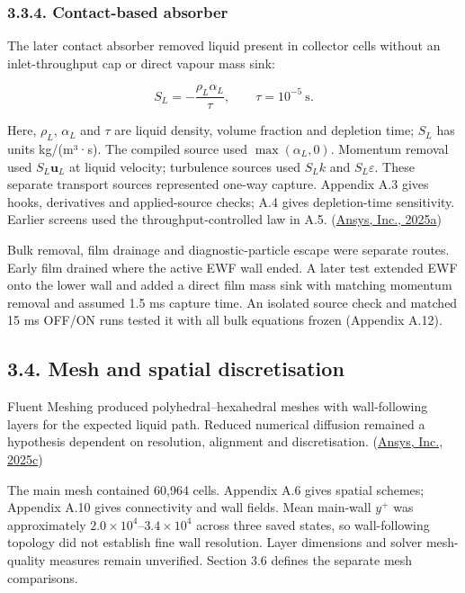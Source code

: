 \documentclass[
  12pt,
  a4paper,
]{article}
\begin{document}
\subsubsection{3.3.4. Contact-based
absorber}\label{contact-based-absorber}

The later contact absorber removed liquid present in collector cells
without an inlet-throughput cap or direct vapour mass sink:

\[
S_L=-\frac{\rho_L\alpha_L}{\tau},\qquad \tau=10^{-5}\ \mathrm{s}.
\]

Here, \(\rho_L\), \(\alpha_L\) and \(\tau\) are liquid density, volume
fraction and depletion time; \(S_L\) has units kg/(m³·s). The compiled
source used \(\max(\alpha_L,0)\). Momentum removal used
\(S_L\boldsymbol u_L\) at liquid velocity; turbulence sources used
\(S_Lk\) and \(S_L\varepsilon\). These separate transport sources
represented one-way capture. Appendix A.3 gives hooks, derivatives and
applied-source checks; A.4 gives depletion-time sensitivity. Earlier
screens used the throughput-controlled law in A.5.
(\href{https://ansyshelp.ansys.com/public/Views/Secured/corp/v252/en/flu_ug/flu_ug_bcs_sec_cell_zones.html}{Ansys,
Inc., 2025a})

Bulk removal, film drainage and diagnostic-particle escape were separate
routes. Early film drained where the active EWF wall ended. A later test
extended EWF onto the lower wall and added a direct film mass sink with
matching momentum removal and assumed 1.5 ms capture time. An isolated
source check and matched 15 ms OFF/ON runs tested it with all bulk
equations frozen (Appendix A.12).

\subsection{3.4. Mesh and spatial
discretisation}\label{mesh-and-spatial-discretisation}

Fluent Meshing produced polyhedral--hexahedral meshes with
wall-following layers for the expected liquid path. Reduced numerical
diffusion remained a hypothesis dependent on resolution, alignment and
discretisation.
(\href{https://ansyshelp.ansys.com/public/Views/Secured/corp/v252/en/flu_ug/flu_ug_GridTypes.html}{Ansys,
Inc., 2025c})

The main mesh contained 60,964 cells. Appendix A.6 gives spatial
schemes; Appendix A.10 gives connectivity and wall fields. Mean
main-wall \(y^+\) was approximately \(2.0\times10^4\)--\(3.4\times10^4\)
across three saved states, so wall-following topology did not establish
fine wall resolution. Layer dimensions and solver mesh-quality measures
remain unverified. Section 3.6 defines the separate mesh comparisons.
\end{document}
